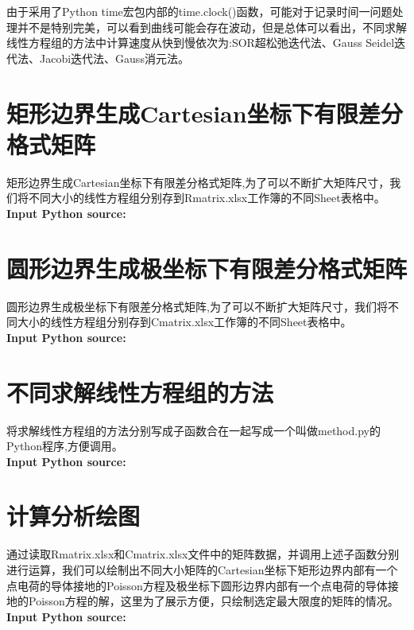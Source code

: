 \documentclass[twoside,twocolumn]{article}
\begin{document}
\begin{CJK*}{UTF8}{gkai}
	由于采用了Python time宏包内部的time.clock()函数，可能对于记录时间一问题处理并不是特别完美，可以看到曲线可能会存在波动，但是总体可以看出，不同求解线性方程组的方法中计算速度从快到慢依次为:SOR超松弛迭代法、Gauss Seidel迭代法、Jacobi迭代法、Gauss消元法。
	

\newpage
\onecolumn
\begin{appendices}
\section{矩形边界生成Cartesian坐标下有限差分格式矩阵}
矩形边界生成Cartesian坐标下有限差分格式矩阵,为了可以不断扩大矩阵尺寸，我们将不同大小的线性方程组分别存到Rmatrix.xlsx工作簿的不同Sheet表格中。\\
\textbf{\textcolor[rgb]{0.98,0.00,0.00}{Input Python source:}}

\newpage
\section{圆形边界生成极坐标下有限差分格式矩阵}
圆形边界生成极坐标下有限差分格式矩阵,为了可以不断扩大矩阵尺寸，我们将不同大小的线性方程组分别存到Cmatrix.xlsx工作簿的不同Sheet表格中。\\
\textbf{\textcolor[rgb]{0.98,0.00,0.00}{Input Python source:}}

\newpage
\section{不同求解线性方程组的方法}
将求解线性方程组的方法分别写成子函数合在一起写成一个叫做method.py的Python程序,方便调用。\\
\textbf{\textcolor[rgb]{0.98,0.00,0.00}{Input Python source:}}

\newpage
\section{计算分析绘图}
通过读取Rmatrix.xlsx和Cmatrix.xlsx文件中的矩阵数据，并调用上述子函数分别进行运算，我们可以绘制出不同大小矩阵的Cartesian坐标下矩形边界内部有一个点电荷的导体接地的Poisson方程及极坐标下圆形边界内部有一个点电荷的导体接地的Poisson方程的解，这里为了展示方便，只绘制选定最大限度的矩阵的情况。\\
\textbf{\textcolor[rgb]{0.98,0.00,0.00}{Input Python source:}}

\newpage

\end{appendices}
\end{CJK*}
\end{document}
